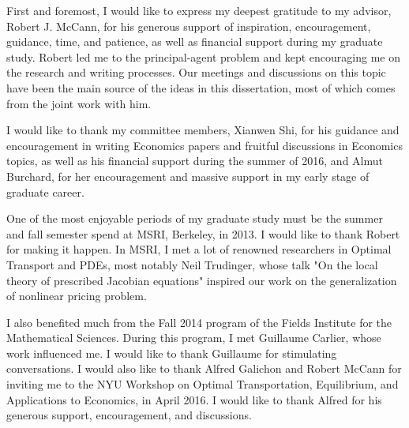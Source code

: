 \documentclass{ut-thesis}[10pt]
\theoremstyle{plain}
\theoremstyle{definition}
\theoremstyle{remark}
\numberwithin{equation}{section}
\begin{document}
\begin{preliminary}
\begin{acknowledgements}

First and foremost, I would like to express my deepest gratitude to my advisor, Robert J. McCann, for his generous support of inspiration, encouragement, guidance,  time, and patience, as well as financial support during my graduate study. Robert led me to the principal-agent problem and kept encouraging me on the research and writing processes. Our meetings and discussions on this topic have been the main source of the ideas in this dissertation, most of which comes from the joint work with him.

I would like to thank my committee members, Xianwen Shi, for his guidance and encouragement in writing Economics papers and fruitful discussions in Economics topics, as well as his financial support during the summer of 2016, and Almut Burchard, for her encouragement and massive support in my early stage of graduate career.

One of the most enjoyable periods of my graduate study must be the summer and fall semester spend at MSRI, Berkeley, in 2013. I would like to thank Robert for making it happen. In MSRI, I met a lot of renowned researchers in Optimal Transport and PDEs, %
most notably Neil Trudinger, whose talk "On the local theory of prescribed Jacobian equations" inspired our work on the generalization of nonlinear pricing problem.    

I also benefited much from the Fall 2014 program of the Fields Institute for the Mathematical Sciences. During this program, I met Guillaume Carlier, whose work influenced me. I would like to thank Guillaume for stimulating conversations. I would also like to thank Alfred Galichon and Robert McCann for inviting me to the NYU Workshop on Optimal Transportation, Equilibrium, and Applications to Economics, in April 2016. I would like to thank Alfred for his generous support, encouragement, and discussions.


\end{acknowledgements}
\end{preliminary}
\end{document}
